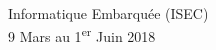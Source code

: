 \begin{titlepage}

{\large Informatique Embarquée (ISEC)}\\[10pt]


{\large 9 Mars au 1\textsuperscript{er} Juin 2018}\\[2cm] %


 

\vfill %

\end{titlepage}


%
%
%
%
%    
%
%
